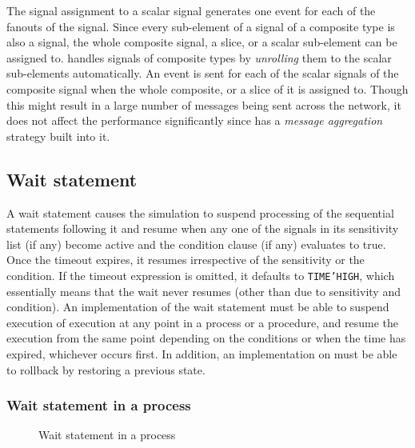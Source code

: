 \documentclass[11pt]{article}
\begin{document}
The signal assignment to a scalar signal generates one event for each
of the fanouts of the signal.  Since every sub-element of a signal of
a composite type is also a signal, the whole composite signal, a
slice, or a scalar sub-element can be assigned to.  \tyvis\/ handles
signals of composite types by \textit{unrolling} them to the scalar
sub-elements automatically.  An event is sent for each of the scalar
signals of the composite signal when the whole composite, or a slice
of it is assigned to.  Though this might result in a large number of
messages being sent across the network, it does not affect the
performance significantly since \warped\/ has a \textit{message
aggregation} strategy built into it.

\subsection{Wait statement}
\label{sec:wait_statement}

A wait statement causes the simulation to suspend processing of the
sequential statements following it and resume when any one of the
signals in its sensitivity list (if any) become active and the
condition clause (if any) evaluates to true.  Once the timeout
expires, it resumes irrespective of the sensitivity or the condition.
If the timeout expression is omitted, it defaults to
\texttt{TIME'HIGH}, which essentially means that the wait never
resumes (other than due to sensitivity and condition).  An
implementation of the wait statement must be able to suspend execution
of execution at any point in a process or a procedure, and resume the
execution from the same point depending on the conditions or when the
time has expired, whichever occurs first.  In addition, an
implementation on \warped\/ must be able to rollback by restoring a
previous state.

\subsubsection{Wait statement in a process}

\begin{figure}[htbp]
  \centerline{}
  \caption{Wait statement in a process}
  \label{fig:wait_process}
\end{figure}
\end{document}
